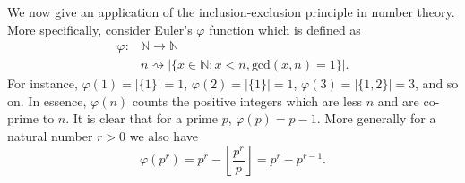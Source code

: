 We now give an application of the inclusion-exclusion principle in number theory. More specifically, consider Euler's $\varphi$ function which is defined as
\begin{align*}
    \varphi: &\mathbb{N}\to \mathbb{N} \\
    &n\rightsquigarrow |\{x\in\mathbb{N}: x< n, \text{gcd}(x,n)=1\}|.
\end{align*}
For instance, $\varphi(1)=|\{1\}|=1$, $\varphi(2)=|\{1\}|=1$, $\varphi(3)=|\{1,2\}|=3$, and so on. In essence, $\varphi(n)$ counts the positive integers which are less $n$ and are co-prime to $n$. It is clear that for a prime $p$, $\varphi(p) = p-1$. More generally for a natural number $r>0$ we also have
\[
\varphi(p^r) = p^r-\left\lfloor \dfrac{p^r}{p}\right\rfloor = p^r-p^{r-1}.
\]

